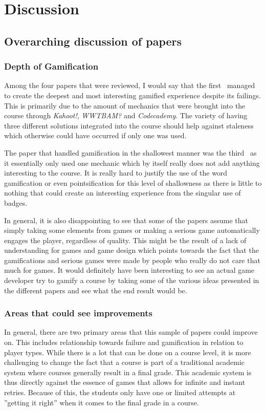 \section{Discussion}

\subsection{Overarching discussion of papers}
\subsubsection{Depth of Gamification}
Among the four papers that were reviewed, I would say that the first~\cite{panagiotis2016climbing} managed to create the deepest and most interesting gamified experience despite its failings. This is primarily due to the amount of mechanics that were brought into the course through \emph{Kahoot!}, \emph{WWTBAM?} and \emph{Codecademy}. The variety of having three different solutions integrated into the course should help against staleness which otherwise could have occurred if only one was used. 

The paper that handled gamification in the shallowest manner was the third~\cite{ortiz2017gamification} as it essentially only used one mechanic which by itself really does not add anything interesting to the course. It is really hard to justify the use of the word gamification or even pointsification for this level of shallowness as there is little to nothing that could create an interesting experience from the singular use of badges. 

In general, it is also disappointing to see that some of the papers assume that simply taking some elements from games or making a serious game automatically engages the player, regardless of quality. This might be the result of a lack of understanding for games and game design which points towards the fact that the gamifications and serious games were made by people who really do not care that much for games. It would definitely have been interesting to see an actual game developer try to gamify a course by taking some of the various ideas presented in the different papers and see what the end result would be. 

\subsubsection{Areas that could see improvements}
In general, there are two primary areas that this sample of papers could improve on. This includes relationship towards failure and gamification in relation to player types. 
While there is a lot that can be done on a course level, it is more challenging to change the fact that a course is part of a traditional academic system where courses generally result in a final grade. This academic system is thus directly against the essence of games that allows for infinite and instant retries. Because of this, the students only have one or limited attempts at ''getting it right'' when it comes to the final grade in a course. 

